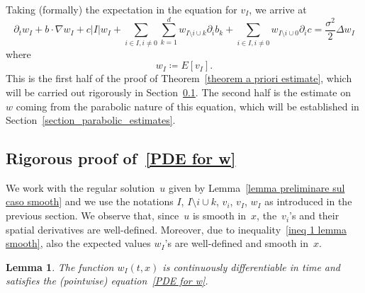 \documentclass[a4paper,10pt]{article}
\newtheorem{lemma}[theorem]{Lemma}
\newcommand\1{\mathbbm{1}}
\numberwithin{equation}{section}
\begin{document}
Taking (formally) the expectation in the equation for $v_{I}$, we arrive at 
\begin{equation}
\partial_{t}w_{I}+b\cdot\nabla w_{I}+c\left\vert I\right\vert w_{I}+\sum_{i\in I,i\neq0}\sum_{k=1}^{d}w_{I\setminus i\cup k}\partial_{i}b_{k}+\sum_{i\in
I,i\neq0}w_{I\setminus i\cup0}\partial_{i}c=\frac{\sigma^{2}}{2}\Delta w_{I}\label{PDE for w} 
\end{equation}
where 
\begin{equation*}
w_{I}\coloneqq E[  v_{I}]  .
\end{equation*}
This is the first half of the proof of Theorem~\ref{theorem a priori estimate}, which will be carried out rigorously in Section~\ref{section_rigorous_w}. The second half is the estimate on~$w$ coming from the parabolic nature of this equation, which will be established in Section~\ref{section_parabolic_estimates}.

\subsection{Rigorous proof of~\eqref{PDE for w}}
\label{section_rigorous_w}

We work with the regular solution~$u$ given by Lemma~\ref{lemma preliminare sul caso smooth} and we use the notations $I$, $I\setminus i\cup k$, $v_{i}$, $v_{I}$, $w_{I}$ as introduced in the previous section. We observe that, since~$u$ is smooth in~$x$, the~$v_{i}$'s and their spatial derivatives are well-defined. Moreover, due to inequality~\eqref{ineq 1 lemma smooth}, also the expected values $w_{I}$'s are well-defined and smooth in~$x$.

\begin{lemma}
The function $w_{I}(t,x)$ is continuously differentiable in
time and satisfies the \textup{(}pointwise\textup{)} equation~\eqref{PDE for w}.
\end{lemma}
\end{document}
